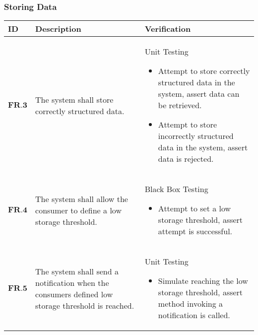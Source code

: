 \subsubsection{Storing Data}
\begin{longtable}[H]{| p{1.5cm} | p{4.5cm} | p{10.5cm}| }
        \hline
        \cellcolor{titleColor}\textbf{ID}    & \cellcolor{titleColor}\textbf{Description}                                                                                                                           & \cellcolor{titleColor}\textbf{Verification}                                                                                                                                                                                                                                                                    
        \\ \hline
        $\textbf{FR.3}$  & The system shall store correctly structured data.                                                                                              & Unit Testing\begin{itemize} \item Attempt to store correctly structured data in the system, assert data can be retrieved.\item Attempt to store incorrectly structured data in the system, assert data is rejected.\end{itemize}                                \\ \hline
        $\textbf{FR.4} $ & The system shall allow the consumer to define a low storage threshold.                                                                         & Black Box Testing\begin{itemize} \item Attempt to set a low storage threshold, assert attempt is successful.\end{itemize}                                                                                                                                                           \\ \hline
        $\textbf{FR.5}$  & The system shall send a notification when the consumers defined low storage threshold is reached.                                              & Unit Testing\begin{itemize} \item Simulate reaching the low storage threshold, assert method invoking a notification is called.\end{itemize}                                                                                                                               \\ \hline

\end{longtable}
